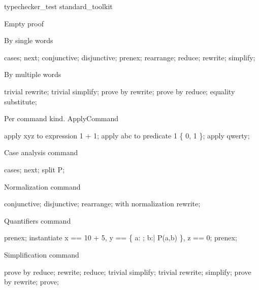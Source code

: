 \begin{zsection}
   \SECTION typechecker\_test \parents standard\_toolkit
\end{zsection}

Empty proof

\begin{zproof}[emptyProof]
\end{zproof}


By single words

\begin{zproof}[singleWord]
cases;
next;
conjunctive;
disjunctive;
prenex;
rearrange;
reduce;
rewrite;
simplify;
\end{zproof}

By multiple words

\begin{zproof}[multipleWords]
trivial rewrite;
trivial simplify;
prove by rewrite;
prove by reduce;
equality substitute;
\end{zproof}

Per command kind. ApplyCommand

\begin{zproof}[applyWordComplex]
apply xyz to expression 1 + 1;
apply abc to predicate 1 \in \{ 0, 1 \};
apply qwerty;
\end{zproof}

Case analysis command

\begin{zproof}[caseAnalysisCmd]
cases;
next;
split P;
\end{zproof}

Normalization command

\begin{zproof}[normCmd]
conjunctive;    %
disjunctive;
rearrange;
with normalization rewrite;
\end{zproof}

Quantifiers command

\begin{zproof}[qntCmd]
prenex;
instantiate x == 10 + 5, y == \{ a: \nat; b:\nat | P(a,b) \},
    z == 0;
prenex;
\end{zproof}

Simplification command

\begin{zproof}[simpCmd]
prove by reduce;
rewrite;
reduce;
trivial simplify;
trivial rewrite;
simplify;
prove by rewrite;
prove;
\end{zproof}

